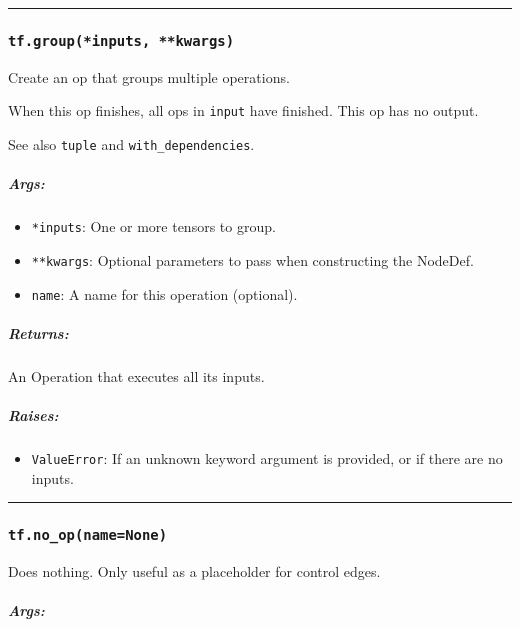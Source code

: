 \begin{center}\rule{0.5\linewidth}{\linethickness}\end{center}

\subsubsection{\texorpdfstring{\texttt{tf.group(*inputs,\ **kwargs)}
}{tf.group(*inputs, **kwargs) }}\label{tf.groupinputs-kwargs}

Create an op that groups multiple operations.

When this op finishes, all ops in \texttt{input} have finished. This op
has no output.

See also \texttt{tuple} and \texttt{with\_dependencies}.

\subparagraph{Args: }\label{args-2}

\begin{itemize}
\tightlist
\item
  \texttt{*inputs}: One or more tensors to group.
\item
  \texttt{**kwargs}: Optional parameters to pass when constructing the
  NodeDef.
\item
  \texttt{name}: A name for this operation (optional).
\end{itemize}

\subparagraph{Returns: }\label{returns-2}

An Operation that executes all its inputs.

\subparagraph{Raises: }\label{raises-1}

\begin{itemize}
\tightlist
\item
  \texttt{ValueError}: If an unknown keyword argument is provided, or if
  there are no inputs.
\end{itemize}

\begin{center}\rule{0.5\linewidth}{\linethickness}\end{center}

\subsubsection{\texorpdfstring{\texttt{tf.no\_op(name=None)}
}{tf.no\_op(name=None) }}\label{tf.noux5fopnamenone}

Does nothing. Only useful as a placeholder for control edges.

\subparagraph{Args: }\label{args-3}

